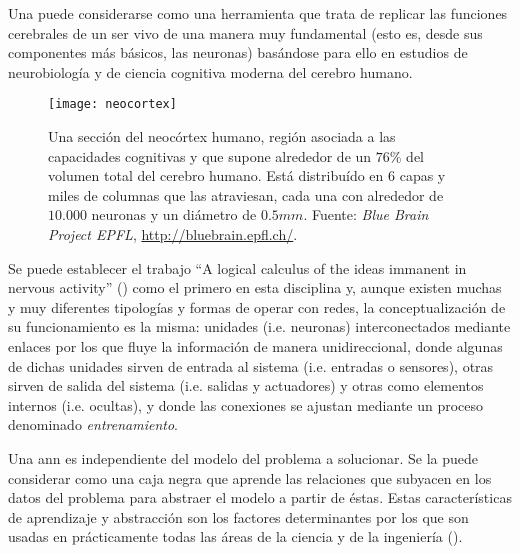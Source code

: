 Una  puede considerarse como una herramienta que trata de replicar las funciones cerebrales de un ser vivo de una manera muy fundamental (esto es, desde sus componentes más básicos, las neuronas) basándose para ello en estudios de neurobiología y de ciencia cognitiva moderna del cerebro humano.

\begin{figure}
	\texttt{[image: neocortex]}
	\caption{Una sección del neocórtex humano, región asociada a las capacidades cognitivas y que supone alrededor de un $76\%$ del volumen total del cerebro humano. Está distribuído en $6$ capas y miles de columnas que las atraviesan, cada una con alrededor de $10.000$ neuronas y un diámetro de $0.5mm$. Fuente: \textit{Blue Brain Project EPFL}, \url{http://bluebrain.epfl.ch/}.}
	\label{fig:neocortex}
\end{figure}

Se puede establecer el trabajo \enquote{A logical calculus of the ideas immanent in nervous activity} (\cite{McCulloch1943}) como el primero en esta disciplina y, aunque existen muchas y muy diferentes tipologías y formas de operar con redes, la conceptualización de su funcionamiento es la misma: unidades (i.e. neuronas) interconectados mediante enlaces por los que fluye la información de manera unidireccional, donde algunas de dichas unidades sirven de entrada al sistema (i.e. entradas o sensores), otras sirven de salida del sistema (i.e. salidas y actuadores) y otras como elementos internos (i.e. ocultas), y donde las conexiones se ajustan mediante un proceso denominado \textit{entrenamiento}.

Una \ac{ann} es independiente del modelo del problema a solucionar. Se la puede considerar como una caja negra que aprende las relaciones que subyacen en los datos del problema para abstraer el modelo a partir de éstas. Estas características de aprendizaje y abstracción son los factores determinantes por los que son usadas en prácticamente todas las áreas de la ciencia y de la ingeniería (\cite{Du2006}).

